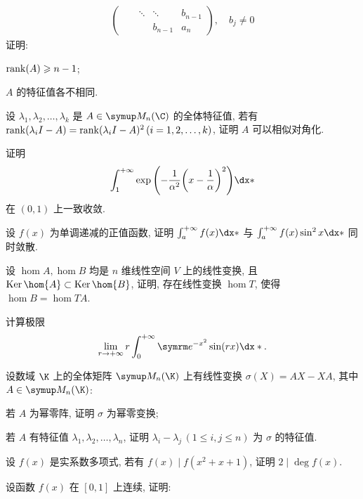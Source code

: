 \begin{exercise}[resume=exer]
\begin{align*}
\begin{pmatrix}
              & & \ddots & \ddots & b_{n-1} \\
              & & & b_{n-1} & a_{n}
          \end{pmatrix},\quad b_{j} \ne 0
      \end{align*}
      证明:
      \begin{exercise}
          \item $ \rank(A) \geqslant n-1 $;
          \item $ A $ 的特征值各不相同.
      \end{exercise}
      \item 设 $ \lambda_{1}, \lambda_{2}, \dots, \lambda_{k} $ 是 $ A\in \MM[\C] $ 的全体特征值, 若有 $ \rank(\lambda_{i}I - A) = \rank(\lambda_{i}I - A)^{2}\,(i = 1, 2, \dots, k) $, 证明 $ A $ 可以相似对角化.
      \item 证明
      \begin{align*}
          \int_{1}^{+\infty}\exp\qty(-\frac{1}{\alpha^{2}}\qty(x-\frac{1}{\alpha})^{2}) \dx*
      \end{align*}
      在 $ (0, 1) $ 上一致收敛.
      \item 设 $ f(x) $ 为单调递减的正值函数, 证明 $ \int_{a}^{+\infty} f(x) \dx* $ 与 $ \int_{a}^{+\infty} f(x)\sin^{2}{x} \dx* $ 同时敛散.
      \item 设 $ \hom{A}, \hom{B} $ 均是 $ n $ 维线性空间 $ V $ 上的线性变换, 且 $ \Ker \hom{A} \subset \Ker \hom{B} $, 证明, 存在线性变换 $ \hom{T} $, 使得 $ \hom{B} = \hom{TA} $.
      \item 计算极限
      \begin{align*}
          \limit{r}{+\infty} r\int_{0}^{+\infty} \me^{-x^{2}}\sin(rx) \dx*.
      \end{align*}
      \item 设数域 $ \K $ 上的全体矩阵 $ \MM[\K] $ 上有线性变换 $ \sigma(X) = AX - XA $, 其中 $ A \in \MM[\K] $:
      \begin{exercise}
          \item 若 $ A $ 为幂零阵, 证明 $ \sigma $ 为幂零变换;
          \item 若 $ A $ 有特征值 $ \lambda_{1}, \lambda_{2}, \dots, \lambda_{n} $, 证明 $ \lambda_{i} - \lambda_{j}\,(1\le i, j\le n) $ 为 $ \sigma $ 的特征值.
      \end{exercise}
      \item 设 $ f(x) $ 是实系数多项式, 若有 $ f(x) \mid f(x^2 + x + 1) $, 证明 $ 2 \mid \deg f(x) $.
      \item 设函数 $ f(x) $ 在 $ [0, 1] $ 上连续, 证明:
      \begin{align*}

\end{align*}
\end{exercise}
